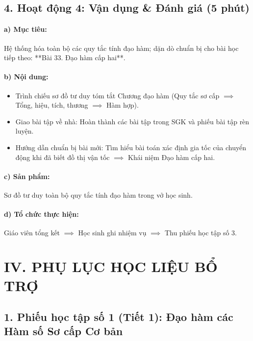 \documentclass[12pt, a4paper]{article}
\begin{document}
\subsection*{4. Hoạt động 4: Vận dụng & Đánh giá (5 phút)}

\paragraph{a) Mục tiêu:} Hệ thống hóa toàn bộ các quy tắc tính đạo hàm; dặn dò chuẩn bị cho bài học tiếp theo: **Bài 33. Đạo hàm cấp hai**.

\paragraph{b) Nội dung:}
\begin{itemize}[leftmargin=0.6cm]
    \item Trình chiếu sơ đồ tư duy tóm tắt Chương đạo hàm (Quy tắc sơ cấp $\implies$ Tổng, hiệu, tích, thương $\implies$ Hàm hợp).
    \item Giao bài tập về nhà: Hoàn thành các bài tập trong SGK và phiếu bài tập rèn luyện.
    \item Hướng dẫn chuẩn bị bài mới: Tìm hiểu bài toán xác định gia tốc của chuyển động khi đã biết đồ thị vận tốc $\implies$ Khái niệm Đạo hàm cấp hai.
\end{itemize}

\paragraph{c) Sản phẩm:} Sơ đồ tư duy toàn bộ quy tắc tính đạo hàm trong vở học sinh.

\paragraph{d) Tổ chức thực hiện:} Giáo viên tổng kết $\implies$ Học sinh ghi nhiệm vụ $\implies$ Thu phiếu học tập số 3.

\section*{IV. PHỤ LỤC HỌC LIỆU BỔ TRỢ}

\subsection*{1. Phiếu học tập số 1 (Tiết 1): Đạo hàm các Hàm số Sơ cấp Cơ bản}
\end{document}
